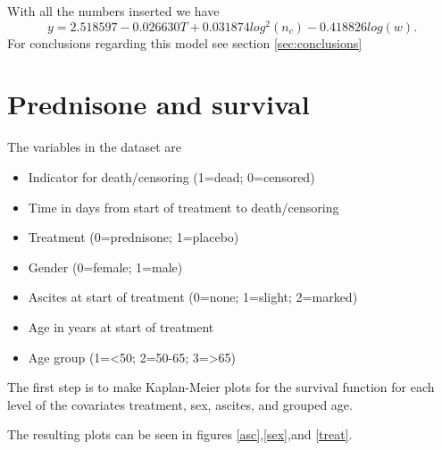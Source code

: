 \documentclass[a4paper]{article}
\begin{document}
With all the numbers inserted we have
\begin{equation}
y = 2.518597 - 0.026630T + 0.031874log^2(n_c) - 0.418826log(w).
\end{equation}
For conclusions regarding this model see section \ref{sec:conclusions}
\section{Prednisone and survival}\label{sec:Imp}
The variables in the dataset are 
\begin{itemize}
 \item{Indicator for death/censoring (1=dead; 0=censored)}
 \item{Time in days from start of treatment to death/censoring}
 \item{Treatment (0=prednisone; 1=placebo)}
 \item{Gender (0=female; 1=male)}
 \item{Ascites at start of treatment (0=none; 1=slight; 2=marked)}
 \item{Age in years at start of treatment}
 \item{Age group (1=<50; 2=50-65; 3=>65)}
\end{itemize}

The first step is to make Kaplan-Meier plots for the survival function for each level of the covariates
treatment, sex, ascites, and grouped age. 

The resulting plots can be seen in figures \ref{asc},\ref{sex},and \ref{treat}.
\end{document}
